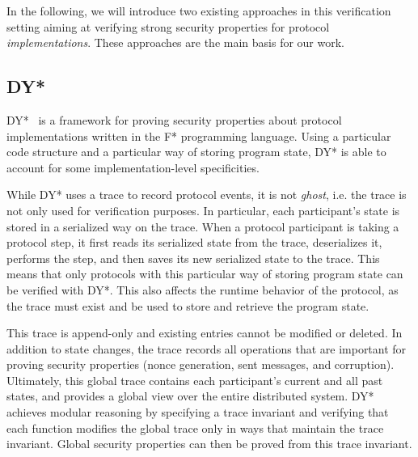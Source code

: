 In the following, we will introduce two existing approaches in this verification setting aiming at verifying strong security properties for protocol \emph{implementations}. These approaches are the main basis for our work.

\subsection{DY*}
\label{sec:dy-star}

DY*~\cite{bhargavan2021text} is a framework for proving security properties about protocol implementations written in the F* programming language.
Using a particular code structure and a particular way of storing program state, DY* is able to account for some implementation-level specificities.

While DY* uses a trace to record protocol events, it is not \emph{ghost}, i.e. the trace is not only used for verification purposes.
In particular, each participant's state is stored in a serialized way on the trace.
When a protocol participant is taking a protocol step, it first reads its serialized state from the trace, deserializes it, performs the step, and then saves its new serialized state to the trace.
This means that only protocols with this particular way of storing program state can be verified with DY*.
This also affects the runtime behavior of the protocol, as the trace must exist and be used to store and retrieve the program state.

This trace is append-only and existing entries cannot be modified or deleted. In addition to state changes, the trace records all operations that are important for proving security properties (nonce generation, sent messages, and corruption).
Ultimately, this global trace contains each participant's current and all past states, and provides a global view over the entire distributed system. %
DY* achieves modular reasoning by specifying a trace invariant and verifying that each function modifies the global trace only in ways that maintain the trace invariant. Global security properties can then be proved from this trace invariant.

